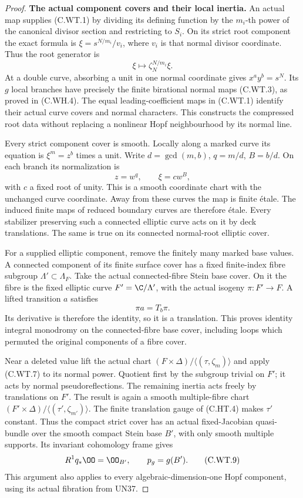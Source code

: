 \begin{proof}
\par\medskip\noindent\textbf{The actual component covers and their local inertia.}
An actual map supplies (C.WT.1) by dividing its defining
function by the \(m_i\)-th power of the canonical divisor
section and restricting to \(S_i\). On its strict root
component the exact formula is
\(\xi=s^{N/m_i}/v_i\), where \(v_i\) is that normal
divisor coordinate. Thus the root generator is
\[
                  \xi\longmapsto
                         \zeta_N^{N/m_i}\xi.
 \tag{C.WT.6}
\]
At a double curve, absorbing a unit in one normal
coordinate gives \(x^a y^b=s^N\). Its \(g\) local
branches have precisely the finite birational
normal maps (C.WT.3), as proved in (C.WH.4).
The equal leading-coefficient maps in (C.WT.1)
identify their actual curve covers and normal
characters. This constructs the compressed root
data without replacing a nonlinear Hopf
neighbourhood by its normal line.

Every strict component cover is smooth. Locally along
a marked curve its equation is
\(\xi^m=z^b\) times a unit. Write
\(d=\gcd(m,b)\), \(q=m/d\), \(B=b/d\).
On each branch its normalization is
\[
                         z=w^q,\qquad \xi=cw^B,
 \tag{C.WT.7}
\]
with \(c\) a fixed root of unity. This is a smooth
coordinate chart with the unchanged curve
coordinate. Away from these curves the map is
finite \'{e}tale. The induced finite maps of
reduced boundary curves are therefore \'{e}tale.
Every stabilizer preserving such a connected
elliptic curve acts on it by deck translations.
The same is true on its connected normal-root
elliptic cover.

For a supplied elliptic component, remove the finitely
many marked base values. A connected component of
its finite surface cover has a fixed finite-index
fibre subgroup \(\Lambda'\subset\Lambda_F\).
Take the actual connected-fibre Stein base cover.
On it the fibre is the fixed elliptic curve
\(F'=\C/\Lambda'\), with the actual isogeny
\(\pi:F'\to F\). A lifted transition \(a\)
satisfies
\[
                            \pi a=T_b\pi.
 \tag{C.WT.8}
\]
Its derivative is therefore the identity, so it
is a translation. This proves identity integral
monodromy on the connected-fibre base cover,
including loops which permuted the original
components of a fibre cover.

Near a deleted value lift the actual chart
\((F\times\Delta)/\langle(\tau,\zeta_m)\rangle\)
and apply (C.WT.7) to its normal power. Quotient
first by the subgroup trivial on \(F'\); it
acts by normal pseudoreflections. The remaining
inertia acts freely by translations on \(F'\).
The result is again a smooth multiple-fibre
chart
\((F'\times\Delta)/\langle(\tau',\zeta_{m'})\rangle\).
The finite translation gauge of (C.HT.4) makes
\(\tau'\) constant. Thus the compact strict cover
has an actual fixed-Jacobian quasi-bundle over
the smooth compact Stein base \(B'\), with only
smooth multiple supports. Its invariant
cohomology frame gives
\[
                  R^1q_*\OO=\OO_{B'},\qquad
                         p_g=g(B').
 \tag{C.WT.9}
\]
This argument also applies to every
algebraic-dimension-one Hopf component, using
its actual fibration from UN37.


\end{proof}
